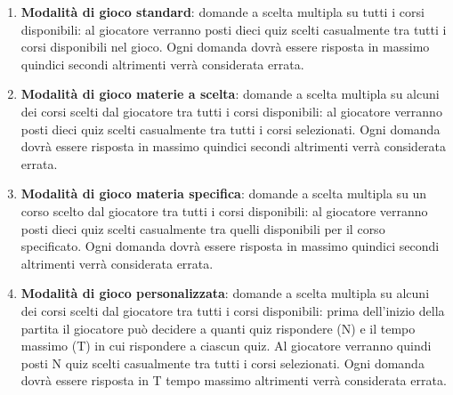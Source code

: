         \begin{enumerate}
            \item \textbf{Modalità di gioco standard}: domande a scelta multipla su tutti i corsi disponibili: al giocatore verranno posti dieci quiz scelti casualmente tra tutti i corsi disponibili nel gioco. Ogni domanda dovrà essere risposta in massimo quindici secondi altrimenti verrà considerata errata.
            
            \item \textbf{Modalità di gioco materie a scelta}: domande a scelta multipla su alcuni dei corsi scelti dal giocatore tra tutti i corsi disponibili: al giocatore verranno posti dieci quiz scelti casualmente tra tutti i corsi selezionati. Ogni domanda dovrà essere risposta in massimo quindici secondi altrimenti verrà considerata errata.
            
            \item \textbf{Modalità di gioco materia specifica}: domande a scelta multipla su un corso scelto dal giocatore tra tutti i corsi disponibili: al giocatore verranno posti dieci quiz scelti casualmente tra quelli disponibili per il corso specificato. Ogni domanda dovrà essere risposta in massimo quindici secondi altrimenti verrà considerata errata.

            \item \textbf{Modalità di gioco personalizzata}: domande a scelta multipla su alcuni dei corsi scelti dal giocatore tra tutti i corsi disponibili: prima dell'inizio della partita il giocatore può decidere a quanti quiz rispondere (N) e il tempo massimo (T) in cui rispondere a ciascun quiz. Al giocatore verranno quindi posti N quiz scelti casualmente tra tutti i corsi selezionati. Ogni domanda dovrà essere risposta in T tempo massimo altrimenti verrà considerata errata.


\end{enumerate}
